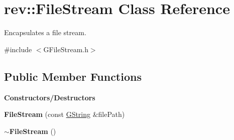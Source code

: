 \hypertarget{classrev_1_1_file_stream}{}\section{rev\+::File\+Stream Class Reference}
\label{classrev_1_1_file_stream}


Encapsulates a file stream.  




{\ttfamily \#include $<$G\+File\+Stream.\+h$>$}

\subsection*{Public Member Functions}
\begin{Indent}\textbf{ Constructors/\+Destructors}\par
\begin{DoxyCompactItemize}
\item 
\mbox{\label{classrev_1_1_file_stream_a5f1187a3b5af811ac41c84f0a25d98fd}} 
{\bfseries File\+Stream} (const \mbox{\hyperlink{classrev_1_1_g_string}{G\+String}} \&file\+Path)
\item 
\mbox{\label{classrev_1_1_file_stream_add625071489ee07ae0af570a5c7a4ef6}} 
{\bfseries $\sim$\+File\+Stream} ()
\end{DoxyCompactItemize}
\end{Indent}
